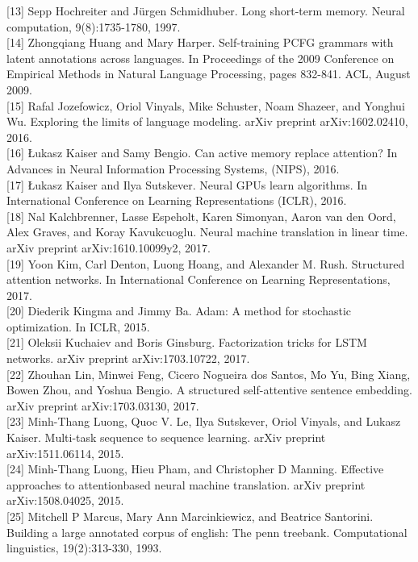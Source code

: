 \documentclass[10pt]{article}
\begin{document}
[13] Sepp Hochreiter and Jürgen Schmidhuber. Long short-term memory. Neural computation, 9(8):1735-1780, 1997.\\[0pt]
[14] Zhongqiang Huang and Mary Harper. Self-training PCFG grammars with latent annotations across languages. In Proceedings of the 2009 Conference on Empirical Methods in Natural Language Processing, pages 832-841. ACL, August 2009.\\[0pt]
[15] Rafal Jozefowicz, Oriol Vinyals, Mike Schuster, Noam Shazeer, and Yonghui Wu. Exploring the limits of language modeling. arXiv preprint arXiv:1602.02410, 2016.\\[0pt]
[16] Łukasz Kaiser and Samy Bengio. Can active memory replace attention? In Advances in Neural Information Processing Systems, (NIPS), 2016.\\[0pt]
[17] Łukasz Kaiser and Ilya Sutskever. Neural GPUs learn algorithms. In International Conference on Learning Representations (ICLR), 2016.\\[0pt]
[18] Nal Kalchbrenner, Lasse Espeholt, Karen Simonyan, Aaron van den Oord, Alex Graves, and Koray Kavukcuoglu. Neural machine translation in linear time. arXiv preprint arXiv:1610.10099y2, 2017.\\[0pt]
[19] Yoon Kim, Carl Denton, Luong Hoang, and Alexander M. Rush. Structured attention networks. In International Conference on Learning Representations, 2017.\\[0pt]
[20] Diederik Kingma and Jimmy Ba. Adam: A method for stochastic optimization. In ICLR, 2015.\\[0pt]
[21] Oleksii Kuchaiev and Boris Ginsburg. Factorization tricks for LSTM networks. arXiv preprint arXiv:1703.10722, 2017.\\[0pt]
[22] Zhouhan Lin, Minwei Feng, Cicero Nogueira dos Santos, Mo Yu, Bing Xiang, Bowen Zhou, and Yoshua Bengio. A structured self-attentive sentence embedding. arXiv preprint arXiv:1703.03130, 2017.\\[0pt]
[23] Minh-Thang Luong, Quoc V. Le, Ilya Sutskever, Oriol Vinyals, and Lukasz Kaiser. Multi-task sequence to sequence learning. arXiv preprint arXiv:1511.06114, 2015.\\[0pt]
[24] Minh-Thang Luong, Hieu Pham, and Christopher D Manning. Effective approaches to attentionbased neural machine translation. arXiv preprint arXiv:1508.04025, 2015.\\[0pt]
[25] Mitchell P Marcus, Mary Ann Marcinkiewicz, and Beatrice Santorini. Building a large annotated corpus of english: The penn treebank. Computational linguistics, 19(2):313-330, 1993.\\[0pt]
\end{document}
